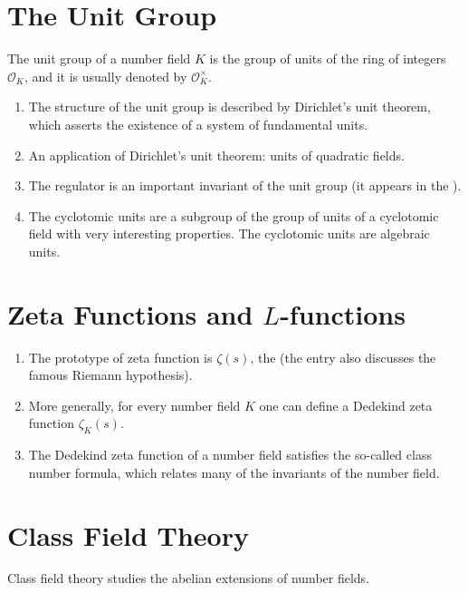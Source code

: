 \documentclass[12pt]{article}
\begin{document}
\section{The Unit Group}
The unit group of a number field $K$ is the group of units of the ring of integers $\mathcal{O}_K$, and it is usually denoted by $\mathcal{O}_K^\times$.
\begin{enumerate}
\item The structure of the unit group is described by Dirichlet's unit theorem, which asserts the existence of a system of fundamental units.
\item An application of Dirichlet's unit theorem: units of quadratic fields.
\item The regulator is an important invariant of the unit group (it appears in the ).
\item The cyclotomic units are a subgroup of the group of units of a cyclotomic field with very interesting properties. The cyclotomic units are algebraic units.
\end{enumerate}

\section{Zeta Functions and $L$-functions}
\begin{enumerate}
\item The prototype of zeta function is $\zeta(s)$, the  (the entry also discusses the famous Riemann hypothesis).
\item More generally, for every number field $K$ one can define a Dedekind zeta function $\zeta_K(s)$.
\item The Dedekind zeta function of a number field satisfies the so-called class number formula, which relates many of the invariants of the number field.
\end{enumerate}
\section{Class Field Theory}
Class field theory studies the abelian extensions of number fields.
\end{document}
